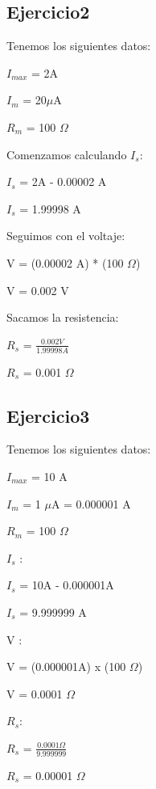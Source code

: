 \documentclass[a4paper,11pt]{article}
\begin{document}
\subsection{Ejercicio2}
\noindent Tenemos los siguientes datos:
\begin{center}
    $I_{max}$ = 2A

    $I_m$ = 20$\mu$A 

    $R_m$ = 100 $\Omega$ 
\end{center}
Comenzamos calculando $I_s$:
\begin{center}
    
    $I_s$ = 2A - 0.00002 A
    
    $I_s$ = 1.99998 A
    
\end{center}
\noindent Seguimos con el voltaje: 
\begin{center}
    
    V = (0.00002 A) * (100 $\Omega$)
    
    V = 0.002 V
    
\end{center}
\noindent Sacamos la resistencia:
\begin{center}
    
    $R_s$ = $\frac{0.002 V}{1.99998 A}$
    
    $R_s$ =  0.001 $\Omega$
    
\end{center}
\subsection{Ejercicio3}
\noindent Tenemos los siguientes datos:
\begin{center}
    $I_{max}$ = 10 A

    $I_m$ = 1 $\mu$A = 0.000001 A 

    $R_m$ = 100 $\Omega$ 
\end{center}

$I_s$ :
\begin{center}
    $I_s$ = 10A - 0.000001A 

    $I_s$ = 9.999999 A
\end{center}

V : 
\begin{center}
    V = (0.000001A) x (100 $\Omega$)

    V = 0.0001 $\Omega$
\end{center}

$R_s$: 
\begin{center}
    $R_s$ = $\frac{0.0001 \Omega}{9.999999}$

    $R_s$ = 0.00001 $\Omega$
\end{center}
\end{document}

